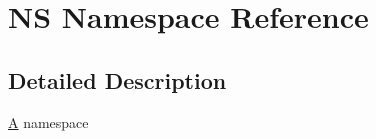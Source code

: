 \hypertarget{namespace_n_s}{}\section{NS Namespace Reference}
\label{namespace_n_s}


\subsection{Detailed Description}
\mbox{\hyperlink{class_a}{A}} namespace 